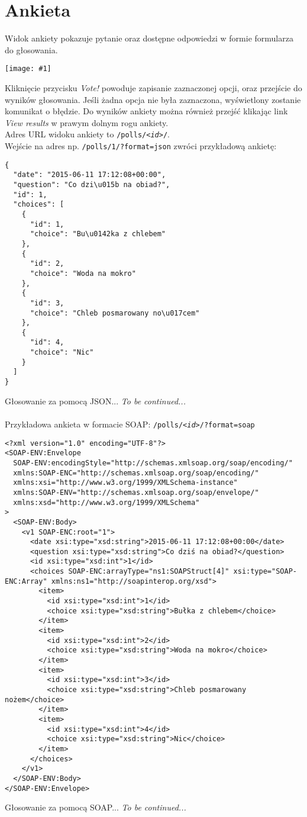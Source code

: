 \documentclass[12pt,a4paper]{article}
\newcommand{\screenshot}[1]{\\\begin{minipage}[c]{\textwidth}\hspace{0em}\texttt{[image: \#1]}\end{minipage}\vspace{0em}}
\newcommand{\json}[1]{\texttt{#1?format=json}}
\newcommand{\soap}[1]{\texttt{#1?format=soap}}
\begin{document}
\section{Ankieta}
Widok ankiety pokazuje pytanie oraz dostępne odpowiedzi w formie formularza do głosowania.
\screenshot{poll.png}
Kliknięcie przycisku \emph{Vote!} powoduje zapisanie zaznaczonej opcji, oraz przejście do wyników głosowania. Jeśli żadna opcja nie była zaznaczona, wyświetlony zostanie komunikat o błędzie. Do wyników ankiety można również przejść klikając link \emph{View results} w prawym dolnym rogu ankiety.\\
Adres URL widoku ankiety to \texttt{/polls/\emph{<id>}/}.\\
Wejście na adres np. \json{/polls/1/} zwróci przykładową ankietę:
\begin{verbatim}
{
  "date": "2015-06-11 17:12:08+00:00",
  "question": "Co dzi\u015b na obiad?",
  "id": 1,
  "choices": [
    {
      "id": 1,
      "choice": "Bu\u0142ka z chlebem"
    },
    {
      "id": 2,
      "choice": "Woda na mokro"
    },
    {
      "id": 3,
      "choice": "Chleb posmarowany no\u017cem"
    },
    {
      "id": 4,
      "choice": "Nic"
    }
  ]
}
\end{verbatim}
Głosowanie za pomocą JSON... \emph{To be continued...}\\\\
Przykładowa ankieta w formacie SOAP: \soap{/polls/\emph{<id>}/}
\begin{verbatim}
<?xml version="1.0" encoding="UTF-8"?>
<SOAP-ENV:Envelope
  SOAP-ENV:encodingStyle="http://schemas.xmlsoap.org/soap/encoding/"
  xmlns:SOAP-ENC="http://schemas.xmlsoap.org/soap/encoding/"
  xmlns:xsi="http://www.w3.org/1999/XMLSchema-instance"
  xmlns:SOAP-ENV="http://schemas.xmlsoap.org/soap/envelope/"
  xmlns:xsd="http://www.w3.org/1999/XMLSchema"
>
  <SOAP-ENV:Body>
    <v1 SOAP-ENC:root="1">
      <date xsi:type="xsd:string">2015-06-11 17:12:08+00:00</date>
      <question xsi:type="xsd:string">Co dziś na obiad?</question>
      <id xsi:type="xsd:int">1</id>
      <choices SOAP-ENC:arrayType="ns1:SOAPStruct[4]" xsi:type="SOAP-ENC:Array" xmlns:ns1="http://soapinterop.org/xsd">
        <item>
          <id xsi:type="xsd:int">1</id>
          <choice xsi:type="xsd:string">Bułka z chlebem</choice>
        </item>
        <item>
          <id xsi:type="xsd:int">2</id>
          <choice xsi:type="xsd:string">Woda na mokro</choice>
        </item>
        <item>
          <id xsi:type="xsd:int">3</id>
          <choice xsi:type="xsd:string">Chleb posmarowany nożem</choice>
        </item>
        <item>
          <id xsi:type="xsd:int">4</id>
          <choice xsi:type="xsd:string">Nic</choice>
        </item>
      </choices>
    </v1>
  </SOAP-ENV:Body>
</SOAP-ENV:Envelope>
\end{verbatim}
Głosowanie za pomocą SOAP... \emph{To be continued...}
\end{document}
